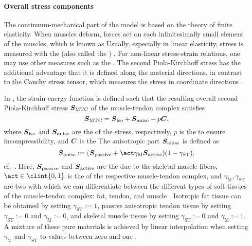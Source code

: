 \paragraph{Overall stress components}

The continuum-mechanical part of the model
is based on the theory of finite elasticity.
When muscles deform, forces act on each infinitesimally small element
of the muscles, which is known as 
Usually, especially in linear elasticity,
stress is measured with the 
(also called the ) \cite{Soennerlind13Why}.
For non-linear stress-strain relations,
one may use other measures such as the
.
The second Piola-Kirchhoff stress has the additional advantage
that it is defined along the material directions,
in contrast to the Cauchy stress tensor,
which measures the stress in coordinate directions \cite{Soennerlind13Why}.

In ,
the strain energy function is defined such that the
resulting overall second Piola-Kirchhoff stress ${\boldsymbol{S}}_\mathrm{MTC}$ of
the muscle-tendon complex satisfies
\begin{equation}
  {\boldsymbol{S}}_\mathrm{MTC}
  = {\boldsymbol{S}}_\mathrm{iso} + {\boldsymbol{S}}_\mathrm{aniso} - p {\boldsymbol{C}},
\end{equation}
where ${\boldsymbol{S}}_\mathrm{iso}$ and ${\boldsymbol{S}}_\mathrm{aniso}$
are the  of the stress, respectively,
$p$ is the  to ensure incompressibility,
and ${\boldsymbol{C}}$ is the 
The anisotropic part ${\boldsymbol{S}}_\mathrm{aniso}$ is defined as
\begin{equation}
  \mat{S}_\mathrm{aniso}
  := (
    \mat{S}_\mathrm{passive} +
    \act \gamma_\mathrm{M} \mat{S}_\mathrm{active}
  ) (1 - \gamma_\mathrm{ST}),
\end{equation}
cf.\ \cite{Valentin18Gradient}.
Here, ${\boldsymbol{S}}_\mathrm{passive}$ and ${\boldsymbol{S}}_\mathrm{active}$
are the 
due to the skeletal muscle fibers,
$\act \in \clint{0, 1}$ is the  of the
respective muscle-tendon complex, and
$\gamma_\mathrm{M}, \gamma_\mathrm{ST}$ are two 
with which we can differentiate between the different types of soft tissues
of the muscle-tendon complex: fat, tendon, and muscle
\cite{Valentin18Gradient}.
Isotropic fat tissue can be obtained
by setting $\gamma_\mathrm{ST} := 1$,
passive anisotropic tendon tissue
by setting $\gamma_\mathrm{ST} := 0$ and $\gamma_\mathrm{M} := 0$, and
skeletal muscle tissue
by setting $\gamma_\mathrm{ST} := 0$ and $\gamma_\mathrm{M} := 1$.
A mixture of these pure materials is
achieved by linear interpolation when setting
$\gamma_\mathrm{M}$ and $\gamma_\mathrm{ST}$ to values between zero and one
\cite{Valentin18Gradient}.

